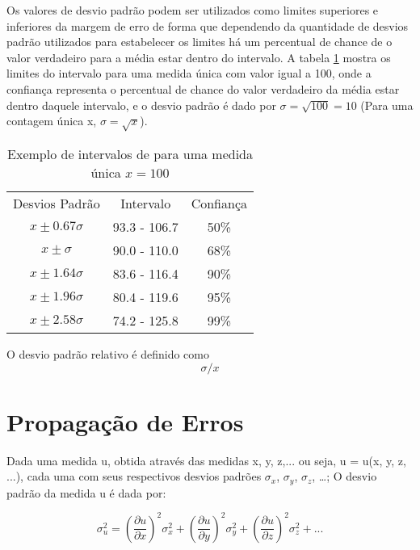 \documentclass[11pt,a4paper]{article}
\begin{document}
		
		 

		Os valores de desvio padrão podem ser utilizados como limites superiores e inferiores da margem de erro de forma que dependendo da quantidade de desvios padrão utilizados para estabelecer os limites há um percentual de chance de o valor verdadeiro para a média estar dentro do intervalo. A tabela \ref{tab:medidasContagem} mostra os limites do intervalo para uma medida única com valor igual a 100, onde a confiança representa o percentual de chance do valor verdadeiro da média estar dentro daquele intervalo, e o desvio padrão é dado por $\sigma = \sqrt{100} = 10$ (Para uma contagem única x, $\sigma = \sqrt{x}$).


		\begin{table}[h]
			\centering
			\caption{Exemplo de intervalos de para uma medida única $x=100$}
			\label{tab:medidasContagem}
			\begin{tabular}{c c c}
				\hline
				\addlinespace[6pt]
				Desvios Padrão & Intervalo & Confiança \\
				\addlinespace[6pt]
				\hline
				$x \pm 0.67 \sigma$ & 93.3 - 106.7 & 50\% \\
				\addlinespace[6pt]
				$x \pm \sigma$ & 90.0 - 110.0 & 68\% \\
				\addlinespace[6pt]
				$x \pm 1.64 \sigma$ & 83.6 - 116.4 & 90\% \\
				\addlinespace[6pt]
				$x \pm 1.96 \sigma$ & 80.4 - 119.6 & 95\% \\
				\addlinespace[6pt]
				$x \pm 2.58 \sigma$ & 74.2 - 125.8 & 99\% \\
				\hline
				\hline
			\end{tabular}
		\end{table}

		O desvio padrão relativo é definido como $$\sigma / x$$

\section{Propagação de Erros}

	Dada uma medida u, obtida através das medidas x, y, z,... ou seja, u = u(x, y, z, ...), cada uma com seus respectivos desvios padrões $\sigma_x$, $\sigma_y$, $\sigma_z$, \dots; O desvio padrão da medida u é dada por:
	
		\begin{equation}
			\sigma_u^2 = \left(\frac{\partial u}{\partial x}\right)^2 \sigma_x^2
				+ \left(\frac{\partial u}{\partial y}\right)^2 \sigma_y^2
				+ \left(\frac{\partial u}{\partial z}\right)^2 \sigma_z^2 + ...
		\end{equation}
\end{document}

